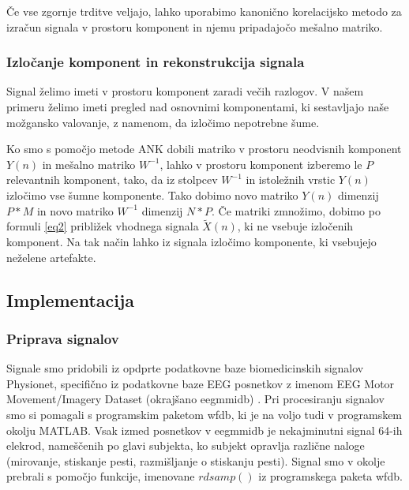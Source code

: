 \documentclass[9pt]{IEEEtran}
\begin{document}
Če vse zgornje trditve veljajo, lahko uporabimo kanonično korelacijsko metodo za izračun signala v prostoru komponent in njemu pripadajočo mešalno matriko.


\subsubsection{Izločanje komponent in rekonstrukcija signala}

Signal želimo imeti v prostoru komponent zaradi večih razlogov. V našem primeru želimo imeti pregled nad osnovnimi komponentami, ki sestavljajo naše možgansko valovanje, z namenom, da izločimo nepotrebne šume.

Ko smo s pomočjo metode ANK dobili matriko v prostoru neodvisnih komponent $Y(n)$ in mešalno matriko $W^{-1}$, lahko v prostoru komponent izberemo le $P$ relevantnih komponent, tako, da iz stolpcev $W^{-1}$ in istoležnih vrstic $Y(n)$ izločimo vse šumne komponente. Tako dobimo novo matriko $Y(n)$ dimenzij $P*M$ in novo matriko  $W^{-1}$ dimenzij $N*P$. Če matriki zmnožimo, dobimo po formuli \ref{eq2} približek vhodnega signala $\tilde{X}(n)$, ki ne vsebuje izločenih komponent. Na tak način lahko iz signala izločimo komponente, ki vsebujejo neželene artefakte. 




\subsection{Implementacija}

\subsubsection{Priprava signalov}

Signale smo pridobili iz opdprte podatkovne baze biomedicinskih signalov Physionet, specifično iz podatkovne baze EEG posnetkov z imenom EEG Motor Movement/Imagery Dataset (okrajšano eegmmidb) \cite{goldberger2000physiobank, schalk2004bci2000}. Pri procesiranju signalov smo si pomagali s programskim paketom wfdb, ki je na voljo tudi v programskem okolju MATLAB. Vsak izmed posnetkov v eegmmidb je nekajminutni signal 64-ih elekrod, nameščenih po glavi subjekta, ko subjekt opravlja različne naloge (mirovanje, stiskanje pesti, razmišljanje o stiskanju pesti). Signal smo v okolje prebrali s pomočjo funkcije, imenovane $rdsamp()$ iz programskega paketa wfdb.
\end{document}
